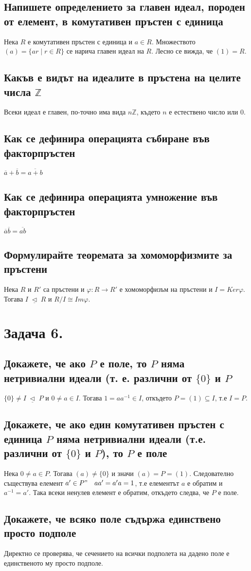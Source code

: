 \documentclass[10pt]{article}
\newcommand*{\Z}{\mathbb{Z}}
\newcommand{\triq}{\; \underline{\triangleleft} \;}
\begin{document}
\subsection*{Напишете определението за главен идеал, породен от елемент, в комутативен пръстен с единица}
Нека $R$ е комутативен пръстен с единица и $a \in R$. Множеството $(a) = \{ar \mid r\in R\}$ се нарича главен идеал на $R$. Лесно се вижда, че $(1) = R$.

\subsection*{Какъв е видът на идеалите в пръстена на целите числа $\Z$}
Всеки идеал е главен, по-точно има вида $n\Z$, където $n$ е естествено число или 0. 

\subsection*{Как се дефинира операцията събиране във факторпръстен}
$\overline{a} + \overline{b} = \overline{a+b}$

\subsection*{Как се дефинира операцията умножение във факторпръстен}
$\overline{a}\overline{b} = \overline{ab}$

\subsection*{Формулирайте теоремата за хомоморфизмите за пръстени}
Нека $R$ и $R'$ са пръстени и $\varphi: R \to R'$ е хомоморфизъм на пръстени и $I = Ker\varphi$. Тогава $I \triq R$ и $R/I \cong Im\varphi$. 

\section*{Задача 6.} 
\subsection*{Докажете, че ако $P$ е поле, то $P$ няма нетривиални идеали (т. е. различни от $\{0\}$ и $P$}
$\{0\} \neq I \triq P$ и $0 \neq a \in I$. Тогава $1 = aa^{-1} \in I$, откъдето $P = (1) \subseteq I$, т.е $I = P$.

\subsection*{Докажете, че ако един комутативен пръстен с единица $P$ няма нетривиални идеали (т.е. различни от $\{0\}$ и $P$), то $P$ е поле}
Нека $0 \neq a \in P$. Тогава $(a) \neq \{0\}$ и значи $(a) = P = (1)$. Следователно съществува елемент $a' \in P" \quad aa' = a'a = 1$, т.е елементът $a$ е обратим и $a^{-1} = a'$. Така всеки ненулев елемент е обратим, откъдето следва, че $P$ е поле.

\subsection*{Докажете, че всяко поле съдържа единствено просто подполе}
Директно се проверява, че сечението на всички подполета на дадено поле е единственото му просто подполе.
\end{document}
